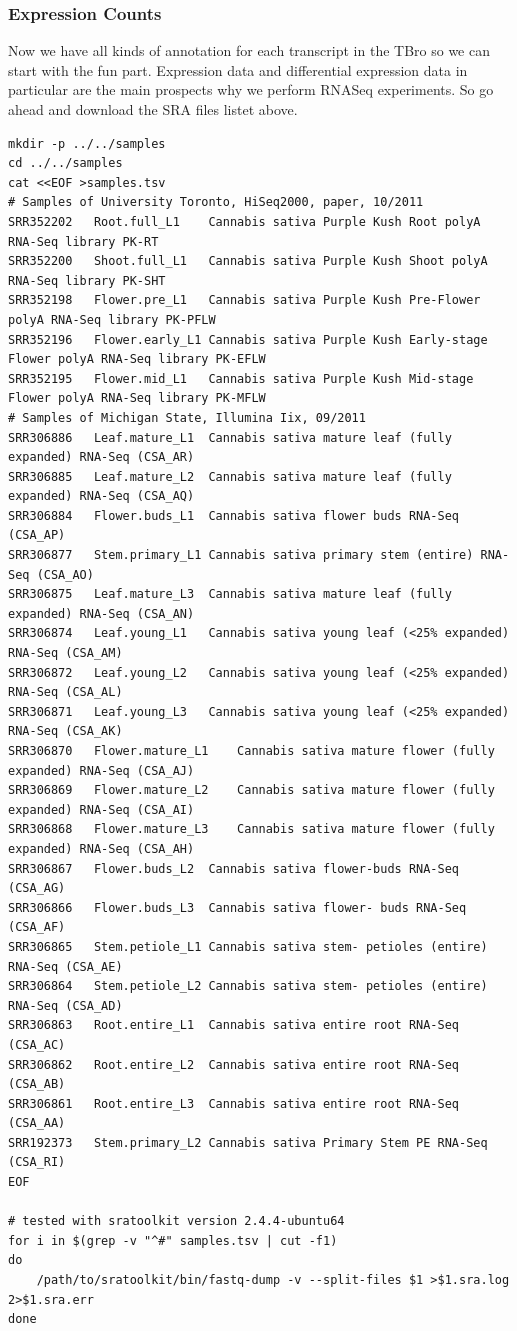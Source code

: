 \documentclass[english]{scrartcl}
\begin{document}
\subsubsection{Expression Counts}
Now we have all kinds of annotation for each transcript in the TBro so we can
start with the fun part. Expression data and differential expression data in
particular are the main prospects why we perform RNASeq experiments. So go ahead
and download the SRA files listet above.
\begin{lstlisting}
mkdir -p ../../samples
cd ../../samples
cat <<EOF >samples.tsv
# Samples of University Toronto, HiSeq2000, paper, 10/2011
SRR352202	Root.full_L1	Cannabis sativa Purple Kush Root polyA RNA-Seq library PK-RT
SRR352200	Shoot.full_L1	Cannabis sativa Purple Kush Shoot polyA RNA-Seq library PK-SHT
SRR352198	Flower.pre_L1	Cannabis sativa Purple Kush Pre-Flower polyA RNA-Seq library PK-PFLW
SRR352196	Flower.early_L1	Cannabis sativa Purple Kush Early-stage Flower polyA RNA-Seq library PK-EFLW
SRR352195	Flower.mid_L1	Cannabis sativa Purple Kush Mid-stage Flower polyA RNA-Seq library PK-MFLW
# Samples of Michigan State, Illumina Iix, 09/2011
SRR306886	Leaf.mature_L1	Cannabis sativa mature leaf (fully expanded) RNA-Seq (CSA_AR)
SRR306885	Leaf.mature_L2	Cannabis sativa mature leaf (fully expanded) RNA-Seq (CSA_AQ)
SRR306884	Flower.buds_L1	Cannabis sativa flower buds RNA-Seq (CSA_AP)
SRR306877	Stem.primary_L1	Cannabis sativa primary stem (entire) RNA-Seq (CSA_AO)
SRR306875	Leaf.mature_L3	Cannabis sativa mature leaf (fully expanded) RNA-Seq (CSA_AN)
SRR306874	Leaf.young_L1	Cannabis sativa young leaf (<25% expanded) RNA-Seq (CSA_AM)
SRR306872	Leaf.young_L2	Cannabis sativa young leaf (<25% expanded) RNA-Seq (CSA_AL)
SRR306871	Leaf.young_L3	Cannabis sativa young leaf (<25% expanded) RNA-Seq (CSA_AK)
SRR306870	Flower.mature_L1	Cannabis sativa mature flower (fully expanded) RNA-Seq (CSA_AJ)
SRR306869	Flower.mature_L2	Cannabis sativa mature flower (fully expanded) RNA-Seq (CSA_AI)
SRR306868	Flower.mature_L3	Cannabis sativa mature flower (fully expanded) RNA-Seq (CSA_AH)
SRR306867	Flower.buds_L2	Cannabis sativa flower-buds RNA-Seq (CSA_AG)
SRR306866	Flower.buds_L3	Cannabis sativa flower- buds RNA-Seq (CSA_AF)
SRR306865	Stem.petiole_L1	Cannabis sativa stem- petioles (entire) RNA-Seq (CSA_AE)
SRR306864	Stem.petiole_L2	Cannabis sativa stem- petioles (entire) RNA-Seq (CSA_AD)
SRR306863	Root.entire_L1	Cannabis sativa entire root RNA-Seq (CSA_AC)
SRR306862	Root.entire_L2	Cannabis sativa entire root RNA-Seq (CSA_AB)
SRR306861	Root.entire_L3	Cannabis sativa entire root RNA-Seq (CSA_AA)
SRR192373	Stem.primary_L2	Cannabis sativa Primary Stem PE RNA-Seq (CSA_RI)
EOF

# tested with sratoolkit version 2.4.4-ubuntu64
for i in $(grep -v "^#" samples.tsv | cut -f1)
do
    /path/to/sratoolkit/bin/fastq-dump -v --split-files $1 >$1.sra.log 2>$1.sra.err
done

\end{lstlisting}
\end{document}
